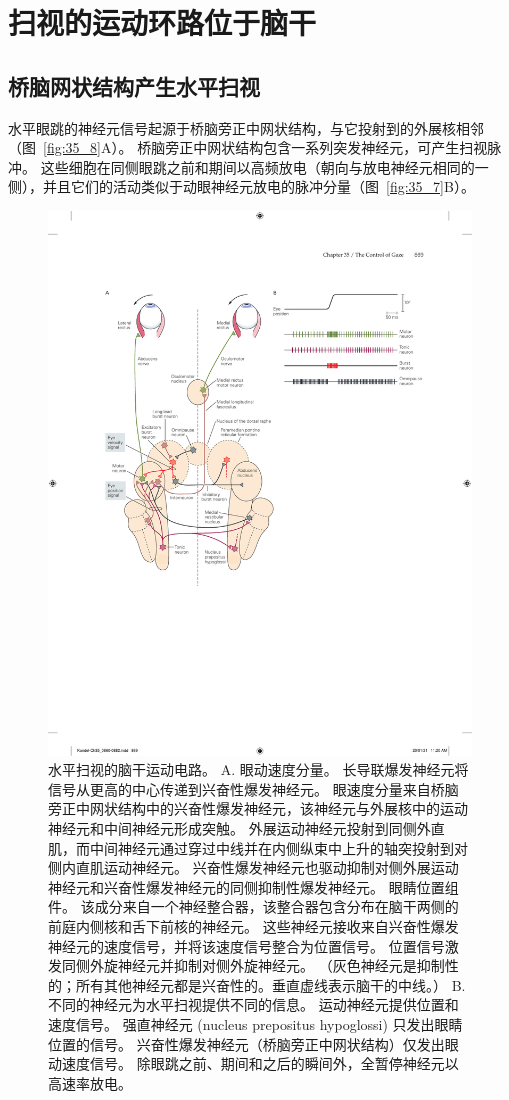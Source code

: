\section{扫视的运动环路位于脑干}

\subsection{桥脑网状结构产生水平扫视}

水平眼跳的神经元信号起源于桥脑旁正中网状结构，与它投射到的外展核相邻（图~\ref{fig:35_8}A）。
桥脑旁正中网状结构包含一系列突发神经元，可产生扫视脉冲。
这些细胞在同侧眼跳之前和期间以高频放电（朝向与放电神经元相同的一侧），并且它们的活动类似于动眼神经元放电的脉冲分量（图~\ref{fig:35_7}B）。


\begin{figure}[htbp]
	\centering
	\includegraphics[width=0.95\linewidth]{chap35/fig_35_8}
	\caption{水平扫视的脑干运动电路。 
		A. 眼动速度分量。 长导联爆发神经元将信号从更高的中心传递到兴奋性爆发神经元。 眼速度分量来自桥脑旁正中网状结构中的兴奋性爆发神经元，该神经元与外展核中的运动神经元和中间神经元形成突触。 外展运动神经元投射到同侧外直肌，而中间神经元通过穿过中线并在内侧纵束中上升的轴突投射到对侧内直肌运动神经元。 兴奋性爆发神经元也驱动抑制对侧外展运动神经元和兴奋性爆发神经元的同侧抑制性爆发神经元。 眼睛位置组件。 该成分来自一个神经整合器，该整合器包含分布在脑干两侧的前庭内侧核和舌下前核的神经元。 这些神经元接收来自兴奋性爆发神经元的速度信号，并将该速度信号整合为位置信号。 位置信号激发同侧外旋神经元并抑制对侧外旋神经元。 （灰色神经元是抑制性的；所有其他神经元都是兴奋性的。垂直虚线表示脑干的中线。） B. 不同的神经元为水平扫视提供不同的信息。 运动神经元提供位置和速度信号。 强直神经元 (nucleus prepositus hypoglossi) 只发出眼睛位置的信号。 兴奋性爆发神经元（桥脑旁正中网状结构）仅发出眼动速度信号。 除眼跳之前、期间和之后的瞬间外，全暂停神经元以高速率放电。}

\end{figure}
